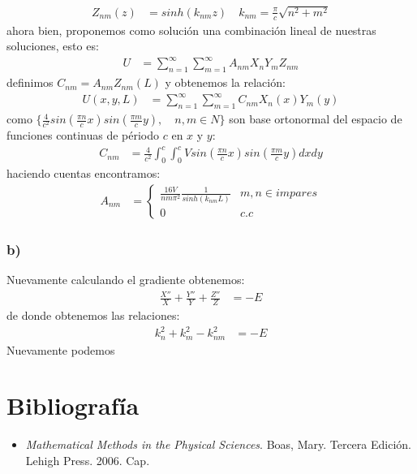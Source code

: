 \documentclass{article}
\begin{document}
\begin{tcolorbox}[breakable]
\begin{align*}
        Z_{nm}(z) &= sinh(k_{nm}z)
        \quad k_{nm} = \frac{\pi}{c} \sqrt{ n^2 + m^2 } 
    \end{align*}
    ahora bien, proponemos como solución una combinación lineal de nuestras soluciones, esto es:
    \begin{align*}
        U 
        &=\sum_{n=1}^\infty \sum_{m=1}^\infty A_{nm}X_nY_mZ_{nm}
    \end{align*}
    definimos $C_{nm} = A_{nm}Z_{nm}(L)$ y obtenemos la relación:
    \begin{align*}
        U(x,y,L) 
        &=\sum_{n=1}^\infty \sum_{m=1}^\infty C_{nm}X_n(x)Y_m(y)
    \end{align*}
    como $\{\frac{4}{c^2}sin(\frac{\pi n}{c}x)sin(\frac{\pi m}{c}y),\quad n,m \in N\}$ son base ortonormal del espacio 
    de funciones continuas de périodo $c$ en $x$ y $y$:
    \begin{align*}
        C_{nm} &= \frac{4}{c^2} \int_0^c\int_0^c Vsin\left(\frac{\pi n}{c}x\right)sin\left(\frac{\pi m}{c}y\right)dxdy
    \end{align*}
    haciendo cuentas encontramos:
    \begin{align*}
        A_{nm} &= 
        \begin{cases}
        \frac{16V}{nm\pi^2}\frac{1}{sinh(k_{nm}L)} & m,n \in impares \\
        0 &c.c    
        \end{cases}
    \end{align*}
    \subsubsection*{b)}
    Nuevamente calculando el gradiente obtenemos:
    \begin{align*}
        \frac{X''}{X} + \frac{Y''}{Y} + \frac{Z''}{Z} &= -E
    \end{align*}
    de donde obtenemos las relaciones:
    \begin{align*}
        k_n^2 + k_m^2 - k_{nm}^2 &= -E
    \end{align*}
    Nuevamente podemos 
\end{tcolorbox}
\section*{Bibliografía}
\begin{itemize}
    \item \textit{Mathematical Methods in the Physical Sciences}. Boas, Mary. Tercera Edición. Lehigh Press. 2006. Cap.
\end{itemize}
\end{document}
